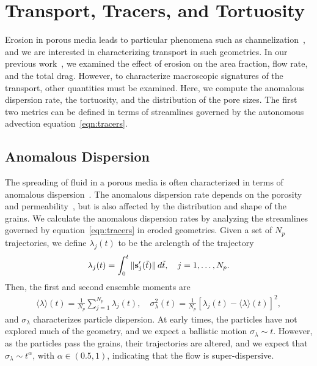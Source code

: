 \documentclass{jfm}
\begin{document}
\section{Transport, Tracers, and Tortuosity}
\label{sec:transport}
Erosion in porous media leads to particular phenomena such as
channelization~\citep{berhanu2012shape}, and we are interested in
characterizing transport in such geometries.  In our previous
work~\citep{qua-moo2018}, we examined the effect of erosion on the area
fraction, flow rate, and the total drag.  However, to characterize
macroscopic signatures of the transport, other quantities must be
examined.  Here, we compute the anomalous dispersion rate, the
tortuosity, and the distribution of the pore sizes.  The first two
metrics can be defined in terms of streamlines governed by the
autonomous advection equation~\eqref{eqn:tracers}.

\subsection{Anomalous Dispersion}
\label{sec:dispersion}
The spreading of fluid in a porous media is often characterized in terms
of anomalous dispersion~\citep{kla-rad-sok2008, den-cor-sch-ber2004}.
The anomalous dispersion rate depends on the porosity and
permeability~\citep{koc-bra1988}, but is also affected by the
distribution and shape of the grains. We calculate the anomalous
dispersion rates by analyzing the streamlines governed by
equation~\eqref{eqn:tracers} in eroded geometries. Given a set of $N_p$
trajectories, we define $\lambda_j(t)$ to be the arclength of the
trajectory
\begin{align}
  \lambda_j(t) = \int_{0}^t \|\ss'_j(\tilde{t})\|\, d\tilde{t}, 
    \quad j=1,\ldots,N_p.
\end{align}
Then, the first and second ensemble moments are
\begin{align}
  \label{eqn:moments}
  \langle \lambda \rangle (t) = 
    \frac{1}{N_p} \sum_{j=1}^{N_p} \lambda_j(t), \quad 
    \sigma_\lambda^2(t) = \frac{1}{N_p} 
    \left[\lambda_j(t) - \langle \lambda \rangle(t) \right]^2,
\end{align}
and $\sigma_\lambda$ characterizes particle dispersion.  At early times,
the particles have not explored much of the geometry, and we expect a
ballistic motion $\sigma_\lambda \sim t$.  However, as the particles
pass the grains, their trajectories are altered, and we expect that
$\sigma_\lambda \sim t^\alpha$, with $\alpha \in (0.5,1)$, indicating
that the flow is super-dispersive.
\end{document}
